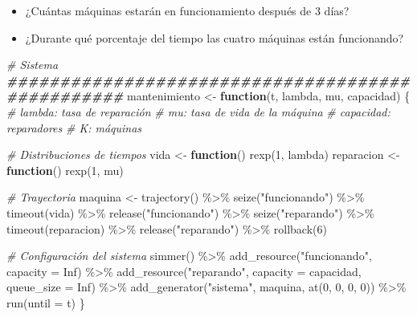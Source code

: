 \documentclass[
]{book}
\newenvironment{Shaded}{\begin{snugshade}}{\end{snugshade}}
\newcommand{\AttributeTok}[1]{\textcolor[rgb]{0.77,0.63,0.00}{#1}}
\newcommand{\CommentTok}[1]{\textcolor[rgb]{0.56,0.35,0.01}{\textit{#1}}}
\newcommand{\ConstantTok}[1]{\textcolor[rgb]{0.00,0.00,0.00}{#1}}
\newcommand{\ControlFlowTok}[1]{\textcolor[rgb]{0.13,0.29,0.53}{\textbf{#1}}}
\newcommand{\DecValTok}[1]{\textcolor[rgb]{0.00,0.00,0.81}{#1}}
\newcommand{\DocumentationTok}[1]{\textcolor[rgb]{0.56,0.35,0.01}{\textbf{\textit{#1}}}}
\newcommand{\FunctionTok}[1]{\textcolor[rgb]{0.00,0.00,0.00}{#1}}
\newcommand{\NormalTok}[1]{#1}
\newcommand{\OtherTok}[1]{\textcolor[rgb]{0.56,0.35,0.01}{#1}}
\newcommand{\SpecialCharTok}[1]{\textcolor[rgb]{0.00,0.00,0.00}{#1}}
\newcommand{\StringTok}[1]{\textcolor[rgb]{0.31,0.60,0.02}{#1}}
\providecommand{\tightlist}{%
  \setlength{\itemsep}{0pt}\setlength{\parskip}{0pt}}
\theoremstyle{definition}
\theoremstyle{definition}
\theoremstyle{definition}
\theoremstyle{definition}
\theoremstyle{remark}
\begin{document}
\begin{itemize}
\tightlist
\item
  ¿Cuántas máquinas estarán en funcionamiento después de 3 días?
\item
  ¿Durante qué porcentaje del tiempo las cuatro máquinas están funcionando?
\end{itemize}

\begin{Shaded}
\begin{Highlighting}[]
\CommentTok{\# Sistema}
\DocumentationTok{\#\#\#\#\#\#\#\#\#\#\#\#\#\#\#\#\#\#\#\#\#\#\#\#\#\#\#\#\#\#\#\#\#\#\#\#\#\#\#\#\#\#\#\#\#\#\#\#\#}
\NormalTok{mantenimiento }\OtherTok{\textless{}{-}} \ControlFlowTok{function}\NormalTok{(t, lambda, mu, capacidad)}
\NormalTok{\{}
  \CommentTok{\# lambda: tasa de reparación}
  \CommentTok{\# mu: tasa de vida de la máquina}
  \CommentTok{\# capacidad: reparadores}
  \CommentTok{\# K: máquinas}
  
  \CommentTok{\# Distribuciones de tiempos}
\NormalTok{  vida }\OtherTok{\textless{}{-}} \ControlFlowTok{function}\NormalTok{() }\FunctionTok{rexp}\NormalTok{(}\DecValTok{1}\NormalTok{, lambda)}
\NormalTok{  reparacion }\OtherTok{\textless{}{-}} \ControlFlowTok{function}\NormalTok{() }\FunctionTok{rexp}\NormalTok{(}\DecValTok{1}\NormalTok{, mu)}
  
  \CommentTok{\# Trayectoria }
\NormalTok{  maquina }\OtherTok{\textless{}{-}} \FunctionTok{trajectory}\NormalTok{() }\SpecialCharTok{\%\textgreater{}\%}
    \FunctionTok{seize}\NormalTok{(}\StringTok{"funcionando"}\NormalTok{) }\SpecialCharTok{\%\textgreater{}\%}
    \FunctionTok{timeout}\NormalTok{(vida) }\SpecialCharTok{\%\textgreater{}\%}
    \FunctionTok{release}\NormalTok{(}\StringTok{"funcionando"}\NormalTok{) }\SpecialCharTok{\%\textgreater{}\%}
    \FunctionTok{seize}\NormalTok{(}\StringTok{"reparando"}\NormalTok{) }\SpecialCharTok{\%\textgreater{}\%}
    \FunctionTok{timeout}\NormalTok{(reparacion) }\SpecialCharTok{\%\textgreater{}\%}
    \FunctionTok{release}\NormalTok{(}\StringTok{"reparando"}\NormalTok{) }\SpecialCharTok{\%\textgreater{}\%}    
    \FunctionTok{rollback}\NormalTok{(}\DecValTok{6}\NormalTok{)}

  \CommentTok{\# Configuración del sistema }
  \FunctionTok{simmer}\NormalTok{() }\SpecialCharTok{\%\textgreater{}\%}
    \FunctionTok{add\_resource}\NormalTok{(}\StringTok{"funcionando"}\NormalTok{, }\AttributeTok{capacity =} \ConstantTok{Inf}\NormalTok{) }\SpecialCharTok{\%\textgreater{}\%}
    \FunctionTok{add\_resource}\NormalTok{(}\StringTok{"reparando"}\NormalTok{, }\AttributeTok{capacity =}\NormalTok{ capacidad, }\AttributeTok{queue\_size =} \ConstantTok{Inf}\NormalTok{) }\SpecialCharTok{\%\textgreater{}\%}
    \FunctionTok{add\_generator}\NormalTok{(}\StringTok{"sistema"}\NormalTok{, maquina, }\FunctionTok{at}\NormalTok{(}\DecValTok{0}\NormalTok{, }\DecValTok{0}\NormalTok{, }\DecValTok{0}\NormalTok{, }\DecValTok{0}\NormalTok{)) }\SpecialCharTok{\%\textgreater{}\%}
    \FunctionTok{run}\NormalTok{(}\AttributeTok{until =}\NormalTok{ t)     }
\NormalTok{\}}
\end{Highlighting}
\end{Shaded}
\end{document}
